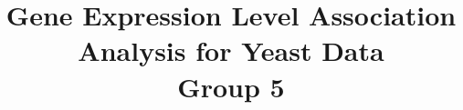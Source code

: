 
\title{
    Gene Expression Level Association Analysis for Yeast Data\\{\vspace{1em} \small Group 5}
}



\maketitle